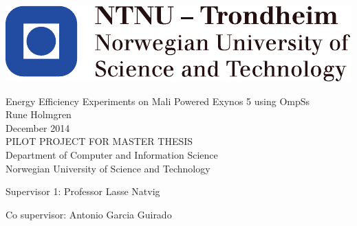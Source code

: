 
\thispagestyle{empty}
\includegraphics[scale=1.1]{fig/NTNU}
\mbox{}\\[6pc]
\begin{center}
\Huge{Energy Efficiency Experiments on Mali Powered Exynos 5 using OmpSs}\\[2pc]

\Large{Rune Holmgren}\\[1pc]
\large{December 2014}\\[2pc]

PILOT PROJECT FOR MASTER THESIS\\
Department of Computer and Information Science\\
Norwegian University of Science and Technology
\end{center}
\vfill

\noindent Supervisor 1: Professor Lasse Natvig

\noindent Co supervisor: Antonio Garcia Guirado

